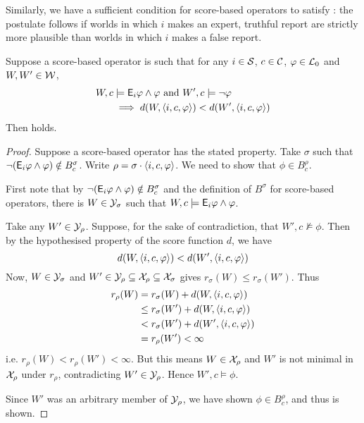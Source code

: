 Similarly, we have a sufficient condition for score-based operators to satisfy
\strongcondsucc{}: the postulate follows if worlds in which $i$ makes an expert,
truthful report are strictly more plausible than worlds in which $i$ makes a
false report.

\begin{lemma}
    \label{kr_lemma_score_based_strongcondsucc_sufficient_conditions}
    Suppose a score-based operator is such that for any $i \in \mathcal{S}$, $c \in \mathcal{C}$,
    $\varphi \in \mathcal{L}{}_0$ and $W, W' \in \mathcal{W}$,
    \begin{align*}
        W, c &\models \mathsf{E}_i\varphi \land \varphi
        \text{ and }
        W', c \models \neg\varphi \\
        &\implies
        d(W, \langle {i, c, \varphi} \rangle) < d(W', \langle {i, c, \varphi} \rangle)
    \end{align*}
    Then \strongcondsucc{} holds.
\end{lemma}

\begin{proof}
    Suppose a score-based operator has the stated property. Take $\sigma$ such
    that $\neg(\mathsf{E}_i\varphi \land \varphi) \notin B^\sigma_c$. Write $\rho = \sigma
    \cdot \langle {i, c, \varphi} \rangle$. We need to show that $\phi \in B^\rho_c$.

    First note that by $\neg(\mathsf{E}_i\varphi \land \varphi) \notin B^\sigma_c$ and the
    definition of $B^\sigma$ for score-based operators, there is $W \in
    \mathcal{Y}_\sigma$ such that $W, c \models \mathsf{E}_i\varphi \land \varphi$.

    Take any $W' \in \mathcal{Y}_\rho$. Suppose, for the sake of contradiction, that
    $W', c \not\models \phi$. Then by the hypothesised property of the score
    function $d$, we have
    \[
        d(W, \langle {i, c, \varphi} \rangle) < d(W', \langle {i, c, \varphi} \rangle)
    \]
    Now, $W \in \mathcal{Y}_\sigma$ and $W' \in \mathcal{Y}_\rho \subseteq \mathcal{X}_\rho \subseteq
    \mathcal{X}_\sigma$ gives $r_\sigma(W) \le r_\sigma(W')$. Thus
    \begin{align*}
        r_\rho(W)
        &= r_\sigma(W) + d(W, \langle {i, c, \varphi} \rangle) \\
        &\le r_\sigma(W') + d(W, \langle {i, c, \varphi} \rangle) \\
        &< r_\sigma(W') + d(W', \langle {i, c, \varphi} \rangle) \\
        &= r_\rho(W') < \infty
    \end{align*}
    i.e. $r_\rho(W) < r_\rho(W') < \infty$. But this means $W \in \mathcal{X}_\rho$ and
    $W'$ is not minimal in $\mathcal{X}_\rho$ under $r_\rho$, contradicting $W' \in
    \mathcal{Y}_\rho$. Hence $W', c \models \phi$.

    Since $W'$ was an arbitrary member of $\mathcal{Y}_\rho$, we have shown $\phi \in
    B^\rho_c$, and thus \strongcondsucc{} is shown.
\end{proof}

